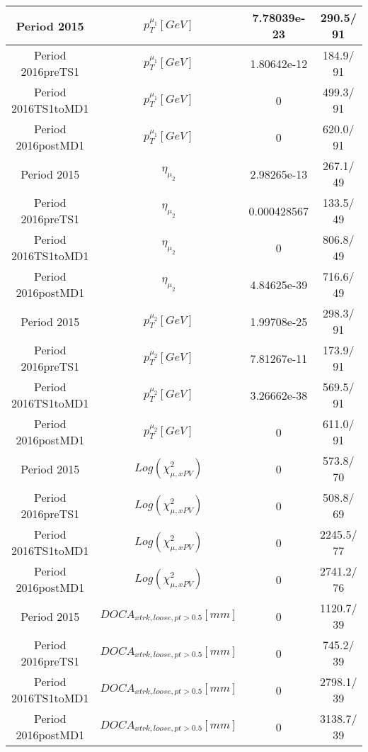 \documentclass{article}
\begin{document}
\begin{longtable}{c|c|c|c}
\hline
 Period 2015 & $p_{T}^{\mu_{1}} [GeV]$ & 7.78039e-23 & 290.5/ 91\\
\hline
 Period 2016preTS1 & $p_{T}^{\mu_{1}} [GeV]$ & 1.80642e-12 & 184.9/ 91\\
\hline
 Period 2016TS1toMD1 & $p_{T}^{\mu_{1}} [GeV]$ & 0 & 499.3/ 91\\
\hline
 Period 2016postMD1 & $p_{T}^{\mu_{1}} [GeV]$ & 0 & 620.0/ 91\\
\hline
 Period 2015 & $\eta_{\mu_{2}}$ & 2.98265e-13 & 267.1/ 49\\
\hline
 Period 2016preTS1 & $\eta_{\mu_{2}}$ & 0.000428567 & 133.5/ 49\\
\hline
 Period 2016TS1toMD1 & $\eta_{\mu_{2}}$ & 0 & 806.8/ 49\\
\hline
 Period 2016postMD1 & $\eta_{\mu_{2}}$ & 4.84625e-39 & 716.6/ 49\\
\hline
 Period 2015 & $p_{T}^{\mu_{2}} [GeV]$ & 1.99708e-25 & 298.3/ 91\\
\hline
 Period 2016preTS1 & $p_{T}^{\mu_{2}} [GeV]$ & 7.81267e-11 & 173.9/ 91\\
\hline
 Period 2016TS1toMD1 & $p_{T}^{\mu_{2}} [GeV]$ & 3.26662e-38 & 569.5/ 91\\
\hline
 Period 2016postMD1 & $p_{T}^{\mu_{2}} [GeV]$ & 0 & 611.0/ 91\\
\hline
 Period 2015 & $Log(\chi^{2}_{\mu,xPV})$ & 0 & 573.8/ 70\\
\hline
 Period 2016preTS1 & $Log(\chi^{2}_{\mu,xPV})$ & 0 & 508.8/ 69\\
\hline
 Period 2016TS1toMD1 & $Log(\chi^{2}_{\mu,xPV})$ & 0 & 2245.5/ 77\\
\hline
 Period 2016postMD1 & $Log(\chi^{2}_{\mu,xPV})$ & 0 & 2741.2/ 76\\
\hline
 Period 2015 & $DOCA_{xtrk, loose, pt>0.5} [mm]$ & 0 & 1120.7/ 39\\
\hline
 Period 2016preTS1 & $DOCA_{xtrk, loose, pt>0.5} [mm]$ & 0 & 745.2/ 39\\
\hline
 Period 2016TS1toMD1 & $DOCA_{xtrk, loose, pt>0.5} [mm]$ & 0 & 2798.1/ 39\\
\hline
 Period 2016postMD1 & $DOCA_{xtrk, loose, pt>0.5} [mm]$ & 0 & 3138.7/ 39\\
\hline
\end{longtable}
\end{document}
